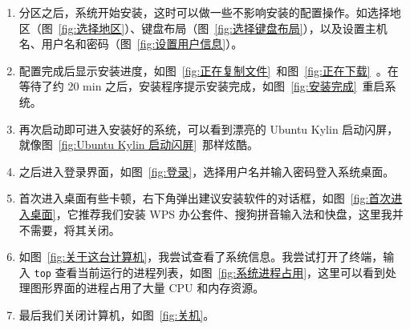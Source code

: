 \documentclass[cs4size,a4paper,nofonts]{ctexart}
\begin{document}
\begin{enumerate}
\item 分区之后，系统开始安装，这时可以做一些不影响安装的配置操作。如选择地区（图~\ref{fig:选择地区}）、键盘布局（图~\ref{fig:选择键盘布局}），以及设置主机名、用户名和密码（图~\ref{fig:设置用户信息}）。

\begin{figure}[htp]
\end{figure}

\begin{figure}[htp]
\end{figure}

\item 配置完成后显示安装进度，如图~\ref{fig:正在复制文件}~和图~\ref{fig:正在下载}~。在等待了约 20 min 之后，安装程序提示安装完成，如图~\ref{fig:安装完成}~重启系统。

\begin{figure}[htp]
\end{figure}

\item 再次启动即可进入安装好的系统，可以看到漂亮的 Ubuntu Kylin 启动闪屏，就像图~\ref{fig:Ubuntu Kylin 启动闪屏}~那样炫酷。

\item 之后进入登录界面，如图~\ref{fig:登录}，选择用户名并输入密码登入系统桌面。

\begin{figure}[htp]
\end{figure}


\item 首次进入桌面有些卡顿，右下角弹出建议安装软件的对话框，如图~\ref{fig:首次进入桌面}，它推荐我们安装 WPS 办公套件、搜狗拼音输入法和快盘，这里我并不需要，将其关闭。

\item 如图~\ref{fig:关于这台计算机}，我尝试查看了系统信息。我尝试打开了终端，输入 \verb|top| 查看当前运行的进程列表，如图~\ref{fig:系统进程占用}，这里可以看到处理图形界面的进程占用了大量 CPU 和内存资源。

\begin{figure}[htp]
\end{figure}

\item 最后我们关闭计算机，如图~\ref{fig:关机}。

\begin{figure}[htp]
\end{figure}

\end{enumerate}
\end{document}

